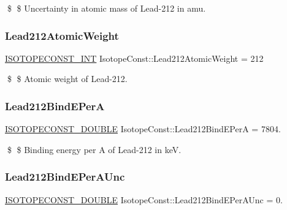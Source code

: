 \$ \$ Uncertainty in atomic mass of Lead-\/212 in amu. \mbox{\label{group___isotope_const-_lead-_pb212_ga1ced68e764cba2c25310988322a06e8a}} 
\subsubsection{\texorpdfstring{Lead212\+Atomic\+Weight}{Lead212AtomicWeight}}
{\footnotesize\ttfamily \mbox{\hyperlink{group___isotope_const-_macros_ga5f18360b3e99483a35c32d789e62621c}{I\+S\+O\+T\+O\+P\+E\+C\+O\+N\+S\+T\+\_\+\+I\+NT}} Isotope\+Const\+::\+Lead212\+Atomic\+Weight = 212}

\$ \$ Atomic weight of Lead-\/212. \mbox{\label{group___isotope_const-_lead-_pb212_ga62d15472468962e87fe3be3dd9eeecce}} 
\subsubsection{\texorpdfstring{Lead212\+Bind\+E\+PerA}{Lead212BindEPerA}}
{\footnotesize\ttfamily \mbox{\hyperlink{group___isotope_const-_macros_ga8f45a7272ce02c0b4c65c44636ed719a}{I\+S\+O\+T\+O\+P\+E\+C\+O\+N\+S\+T\+\_\+\+D\+O\+U\+B\+LE}} Isotope\+Const\+::\+Lead212\+Bind\+E\+PerA = 7804.}

\$ \$ Binding energy per A of Lead-\/212 in keV. \mbox{\label{group___isotope_const-_lead-_pb212_gaed90e5c4a7868e51c53838ae23802ab3}} 
\subsubsection{\texorpdfstring{Lead212\+Bind\+E\+Per\+A\+Unc}{Lead212BindEPerAUnc}}
{\footnotesize\ttfamily \mbox{\hyperlink{group___isotope_const-_macros_ga8f45a7272ce02c0b4c65c44636ed719a}{I\+S\+O\+T\+O\+P\+E\+C\+O\+N\+S\+T\+\_\+\+D\+O\+U\+B\+LE}} Isotope\+Const\+::\+Lead212\+Bind\+E\+Per\+A\+Unc = 0.}

